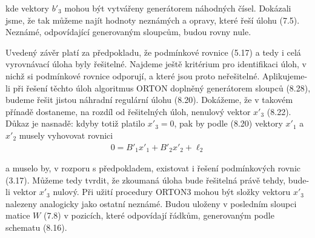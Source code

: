 \noindent
kde vektory $b'_3$ mohou být vytvářeny generátorem náhodných čísel.
Dokázali jsme, že tak můžeme najít hodnoty neznámých a opravy,
které řeší úlohu (7.5). Neznámé, odpovídající generovaným
sloupcům, budou rovny nule.


Uvedený závěr platí za předpokladu, že podmínkové rovnice
(5.17) a tedy i celá vyrovnávací úloha byly řešitelné. Najdeme
ještě kritérium pro identifikaci úloh, v nichž si podmínkové
rovnice odporují, a které jsou proto neřešitelné. Aplikujeme-li
při řešení těchto úloh algoritmus ORTON doplněný generátorem
sloupců (8.28), budeme řešit jistou náhradní regulární úlohu
(8.20). Dokážeme, že v takovém přínadě dostaneme, na rozdíl od
řešitelných úloh, nenulový vektor $x'_3$ (8.22). Důkaz je nasnadě:
kdyby totiž platilo $x'_3 = 0$, pak by podle (8.20) vektory
$x'_1$ a $x'_2$
%
musely  vyhovovat rovnici
%
\begin{align*}
  \tag{8.29}
  0 = B'_1x'_1 + B'_2x'_2 + \ell_2
\end{align*}

\noindent
a muselo by, v rozporu s předpokladem, existovat i řešení
podmínkových rovnic (3.17). Můžeme tedy tvrdit, že zkoumaná úloha
bude řešitelná právě tehdy, bude-li vektor $x'_3$ nulový. Při
užití procedury ORTON3 mohou být složky vektoru $x'_3$ nalezeny
analogicky jako ostatní neznámé. Budou uloženy v posledním sloupci
matice $W$ (7.8) v pozicích, které odpovídají řádkům,
generovaným podle schematu (8.16).
